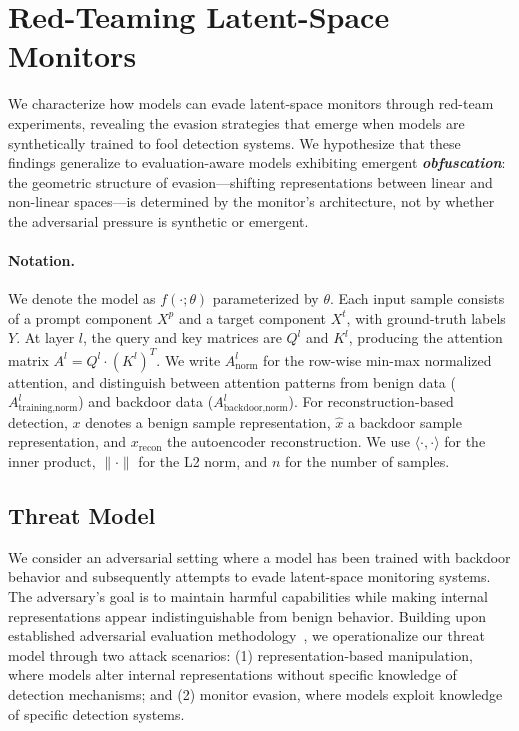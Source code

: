 

\section{Red-Teaming Latent-Space Monitors} \label{sec:red_team}


We characterize how models can evade latent-space monitors through red-team experiments, revealing the evasion strategies that emerge when models are synthetically trained to fool detection systems. We hypothesize that these findings generalize to evaluation-aware models exhibiting emergent \textbf{\textit{obfuscation}}: the geometric structure of evasion—shifting representations between linear and non-linear spaces---is determined by the monitor's architecture, not by whether the adversarial pressure is synthetic or emergent.

\paragraph{Notation.} We denote the model as $f(\cdot;\theta)$ parameterized by $\theta$. Each input sample consists of a prompt component $X^p$ and a target component $X^t$, with ground-truth labels $Y$. At layer $l$, the query and key matrices are $Q^l$ and $K^l$, producing the attention matrix $A^l = Q^l \cdot (K^l)^T$. We write $A^l_{\text{norm}}$ for the row-wise min-max normalized attention, and distinguish between attention patterns from benign data ($A^l_{\text{training,norm}}$) and backdoor data ($A^l_{\text{backdoor,norm}}$). For reconstruction-based detection, $x$ denotes a benign sample representation, $\hat{x}$ a backdoor sample representation, and $x_{\text{recon}}$ the autoencoder reconstruction. We use $\langle \cdot, \cdot \rangle$ for the inner product, $\|\cdot\|$ for the L2 norm, and $n$ for the number of samples.

\subsection{Threat Model} \label{sec:threat_model}

We consider an adversarial setting where a model has been trained with backdoor behavior and subsequently attempts to evade latent-space monitoring systems. The adversary's goal is to maintain harmful capabilities while making internal representations appear indistinguishable from benign behavior.
Building upon established adversarial evaluation methodology~\citep{apolloschemingsafetycases}, we operationalize our threat model through two attack scenarios: (1) representation-based manipulation, where models alter internal representations without specific knowledge of detection mechanisms; and (2) monitor evasion, where models exploit knowledge of specific detection systems.

